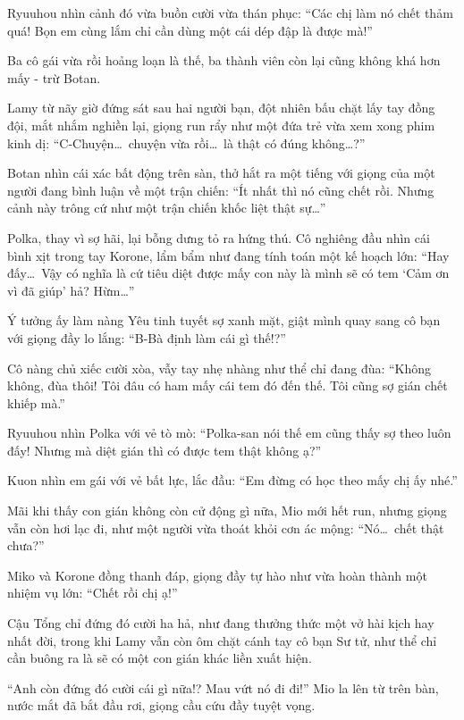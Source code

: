 \documentclass[../main.tex]{subfiles}
\begin{document}
Ryuuhou nhìn cảnh đó vừa buồn cười vừa thán phục: ``Các chị làm nó chết thảm quá! Bọn em cùng lắm chỉ cần dùng một cái dép đập là được mà!''

Ba cô gái vừa rồi hoảng loạn là thế, ba thành viên còn lại cũng không khá hơn mấy - trừ Botan.

Lamy từ nãy giờ đứng sát sau hai người bạn, đột nhiên bấu chặt lấy tay đồng đội, mắt nhắm nghiền lại, giọng run rẩy như một đứa trẻ vừa xem xong phim kinh dị: ``C-Chuyện\dots\ chuyện vừa rồi\dots\ là thật có đúng không\dots?''

Botan nhìn cái xác bất động trên sàn, thở hắt ra một tiếng với giọng của một người đang bình luận về một trận chiến: ``Ít nhất thì nó cũng chết rồi. Nhưng cảnh này trông cứ như một trận chiến khốc liệt thật sự\dots''

Polka, thay vì sợ hãi, lại bỗng dưng tỏ ra hứng thú. Cô nghiêng đầu nhìn cái bình xịt trong tay Korone, lẩm bẩm như đang tính toán một kế hoạch lớn: ``Hay đấy\dots\ Vậy có nghĩa là cứ tiêu diệt được mấy con này là mình sẽ có tem `Cảm ơn vì đã giúp' hả? Hừm\dots''

Ý tưởng ấy làm nàng Yêu tinh tuyết sợ xanh mặt, giật mình quay sang cô bạn với giọng đầy lo lắng: ``B-Bà định làm cái gì thế!?''

Cô nàng chủ xiếc cười xòa, vẫy tay nhẹ nhàng như thể chỉ đang đùa: ``Không không, đùa thôi! Tôi đâu có ham mấy cái tem đó đến thế. Tôi cũng sợ gián chết khiếp mà.''

Ryuuhou nhìn Polka với vẻ tò mò: ``Polka-san nói thế em cũng thấy sợ theo luôn đấy! Nhưng mà diệt gián thì có được tem thật không ạ?''

Kuon nhìn em gái với vẻ bất lực, lắc đầu: ``Em đừng có học theo mấy chị ấy nhé.''

Mãi khi thấy con gián không còn cử động gì nữa, Mio mới hết run, nhưng giọng vẫn còn hơi lạc đi, như một người vừa thoát khỏi cơn ác mộng: ``Nó\dots\ chết thật chưa?''

Miko và Korone đồng thanh đáp, giọng đầy tự hào như vừa hoàn thành một nhiệm vụ lớn: ``Chết rồi chị ạ!''

Cậu Tổng chỉ đứng đó cười ha hả, như đang thưởng thức một vở hài kịch hay nhất đời, trong khi Lamy vẫn còn ôm chặt cánh tay cô bạn Sư tử, như thể chỉ cần buông ra là sẽ có một con gián khác liền xuất hiện.

``Anh còn đứng đó cười cái gì nữa!? Mau vứt nó đi đi!'' Mio la lên từ trên bàn, nước mắt đã bắt đầu rơi, giọng cầu cứu đầy tuyệt vọng.
\end{document}
